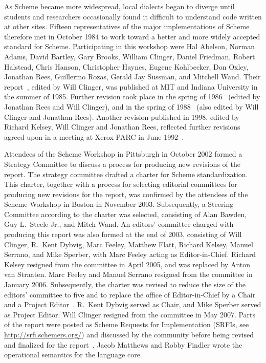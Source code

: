 \documentclass[twoside,twocolumn]{algol60}
\begin{document}
\vest As Scheme became more widespread,
local dialects began to diverge until students and researchers
occasionally found it difficult to understand code written at other
sites.
Fifteen representatives of the major implementations of Scheme therefore
met in October 1984 to work toward a better and more widely accepted
standard for Scheme.
Participating in this workshop were Hal Abelson, Norman Adams, David
Bartley, Gary Brooks, William Clinger, Daniel Friedman, Robert Halstead,
Chris Hanson, Christopher Haynes, Eugene Kohlbecker, Don Oxley, Jonathan Rees,
Guillermo Rozas, Gerald Jay Sussman, and Mitchell Wand.
Their report~\cite{RRRS}, edited by Will Clinger,
was published at MIT and Indiana University in the summer of 1985.
Further revision took place in the spring of 1986~\cite{R3RS} (edited
by Jonathan Rees and Will Clinger),
and in the spring of 1988~\cite{R4RS} (also edited by Will Clinger and
Jonathan Rees).  Another revision published in 1998, edited
by Richard Kelsey, Will Clinger and Jonathan Rees,
reflected further revisions agreed upon in a meeting at Xerox PARC in
June 1992~\cite{R5RS}.

Attendees of the Scheme Workshop in Pittsburgh in October 2002 formed
a Strategy Committee to discuss a process for producing new revisions
of the report.  The strategy committee drafted a charter for Scheme
standardization.  This charter, together with a process for selecting
editorial committees for producing new revisions for the report, was
confirmed by the attendees of the Scheme Workshop in Boston in
November 2003.  Subsequently, a Steering Committee according to the
charter was selected, consisting of Alan Bawden, Guy L.\ Steele Jr.,
and Mitch Wand.  An editors' committee charged with producing this report was
also formed at the end of 2003, consisting of Will Clinger,
R.\ Kent Dybvig, Marc Feeley, Matthew Flatt, Richard Kelsey, Manuel
Serrano, and Mike Sperber, with Marc Feeley acting as Editor-in-Chief.
Richard Kelsey resigned from the committee in April 2005, and was
replaced by Anton van Straaten.  
Marc Feeley and Manuel Serrano
resigned from the committee in January 2006.  Subsequently, the charter
was revised to reduce the size of the editors' committee to five and
to replace the office of Editor-in-Chief by a Chair and a Project
Editor~\cite{SchemeCharter2006}.  R.\ Kent Dybvig served as Chair, and
Mike Sperber served as Project Editor.  Will Clinger resigned from the
committee in May 2007.
Parts of the report were posted as Scheme Requests for Implementation
(SRFIs, see \url{http://srfi.schemers.org/})
and discussed by the community before being revised and finalized for
the report~\cite{srfi75,srfi76,srfi77,srfi83,srfi93}.
Jacob Matthews and Robby
Findler wrote the operational semantics for the language core.
\end{document}
